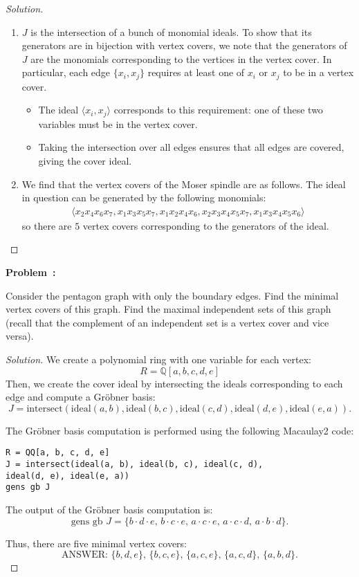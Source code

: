 \documentclass[12pt]{article}
\newcounter{problem}
\newenvironment{problem}[1][Problem]{%
	\refstepcounter{problem}%
	\noindent\textbf{\color{magenta}#1~\theproblem: }%
}{}
\newenvironment{solution}
    {\renewcommand{\qedsymbol}{}\begin{proof}[Solution]}
    {\end{proof}}
\begin{document}
\begin{solution}
	\begin{enumerate}
		\item $J$ is the intersection of a bunch of monomial ideals. To show that its generators are in bijection with vertex covers, we note that the generators of $J$ are the monomials corresponding to the vertices in the vertex cover. In particular, each edge \(\{x_i, x_j\}\) requires at least one of \(x_i\) or \(x_j\) to be in a vertex cover.
		      \begin{itemize}
			      \item The ideal \(\langle x_i, x_j \rangle\) corresponds to this requirement: one of these two variables must be in the vertex cover.
			      \item Taking the intersection over all edges ensures that all edges are covered, giving the cover ideal.
		      \end{itemize}
		\item We find that the vertex covers of the Moser spindle are as follows.
		      The ideal in question can be generated by the following monomials: \begin{align*}
			      \langle x_2 x_4 x_6 x_7, x_1 x_3 x_5 x_7, x_1 x_2 x_4 x_6, x_2 x_3 x_4 x_5 x_7, x_1 x_3 x_4 x_5 x_6 \rangle
		      \end{align*} so there are $5$ vertex covers corresponding to the generators of the ideal.
	\end{enumerate}
\end{solution}

\begin{problem}
Consider the pentagon graph with only the boundary edges. Find the minimal vertex covers of this graph. Find the maximal independent sets of this graph (recall that the complement of an independent set is a vertex cover and vice versa).
\end{problem}

\begin{solution}
	We create a polynomial ring with one variable for each vertex:
	\[
		R = \mathbb{Q}[a, b, c, d, e]
	\]
	Then, we create the cover ideal by intersecting the ideals corresponding to each edge and compute a Gröbner basis:
	\[
		J = \text{intersect}(\text{ideal}(a, b), \text{ideal}(b, c), \text{ideal}(c, d), \text{ideal}(d, e), \text{ideal}(e, a)).
	\]

	The Gröbner basis computation is performed using the following Macaulay2 code:
	\begin{verbatim}
R = QQ[a, b, c, d, e]
J = intersect(ideal(a, b), ideal(b, c), ideal(c, d),
ideal(d, e), ideal(e, a))
gens gb J
\end{verbatim}

	The output of the Gröbner basis computation is:
	\[
		\text{gens gb } J = \{b \cdot d \cdot e, \, b \cdot c \cdot e, \, a \cdot c \cdot e, \, a \cdot c \cdot d, \, a \cdot b \cdot d\}.
	\]

	Thus, there are five minimal vertex covers:
	\[
		\text{ANSWER: } \{b, d, e\}, \, \{b, c, e\}, \, \{a, c, e\}, \, \{a, c, d\}, \, \{a, b, d\}.
	\]
\end{solution}
\end{document}

